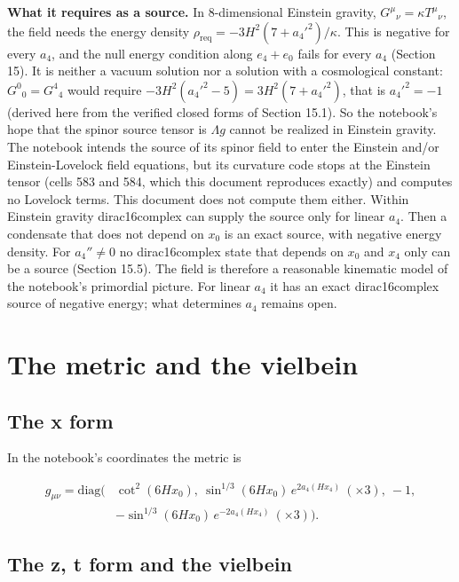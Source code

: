 \documentclass[11pt]{article}
\begin{document}
\textbf{What it requires as a source.} In 8-dimensional Einstein gravity, $G^\mu{}_\nu=\kappa T^\mu{}_\nu$, the field needs the energy density $\rho_{\mathrm{req}}=-3H^2(7+a_4'^2)/\kappa$. This is negative for every $a_4$, and the null energy condition along $e_4+e_0$ fails for every $a_4$ (Section 15). It is neither a vacuum solution nor a solution with a cosmological constant: $G^0{}_0=G^4{}_4$ would require $-3H^2(a_4'^2-5)=3H^2(7+a_4'^2)$, that is $a_4'^2=-1$ (derived here from the verified closed forms of Section 15.1). So the notebook's hope that the spinor source tensor is $\Lambda g$ cannot be realized in Einstein gravity. The notebook intends the source of its spinor field to enter the Einstein and/or Einstein-Lovelock field equations, but its curvature code stops at the Einstein tensor (cells 583 and 584, which this document reproduces exactly) and computes no Lovelock terms. This document does not compute them either. Within Einstein gravity dirac16complex can supply the source only for linear $a_4$. Then a condensate that does not depend on $x_0$ is an exact source, with negative energy density. For $a_4''\ne0$ no dirac16complex state that depends on $x_0$ and $x_4$ only can be a source (Section 15.5). The field is therefore a reasonable kinematic model of the notebook's primordial picture. For linear $a_4$ it has an exact dirac16complex source of negative energy; what determines $a_4$ remains open.

\section{The metric and the vielbein}

\subsection{The x form}

In the notebook's coordinates the metric is

\[
\begin{aligned}
g_{\mu\nu}=\mathrm{diag}\bigl(&\cot^2(6Hx_0),\ \sin^{1/3}(6Hx_0)\,e^{2a_4(Hx_4)}\ (\times3),\ -1,\\
&-\sin^{1/3}(6Hx_0)\,e^{-2a_4(Hx_4)}\ (\times3)\bigr).
\end{aligned}
\]

\subsection{The z, t form and the vielbein}
\end{document}
